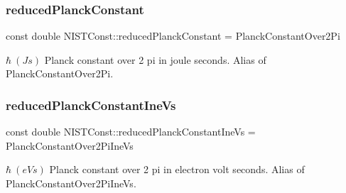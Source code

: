 \subsubsection{\texorpdfstring{reduced\+Planck\+Constant}{reducedPlanckConstant}}
{\footnotesize\ttfamily const double N\+I\+S\+T\+Const\+::reduced\+Planck\+Constant = Planck\+Constant\+Over2\+Pi}

$\hbar \ (J s)$ Planck constant over 2 pi in joule seconds. Alias of Planck\+Constant\+Over2\+Pi. \mbox{\label{group___planck_constant_gab9efdc081c1c1a03ca7a233d1589b1d8}} 
\subsubsection{\texorpdfstring{reduced\+Planck\+Constant\+Ine\+Vs}{reducedPlanckConstantIneVs}}
{\footnotesize\ttfamily const double N\+I\+S\+T\+Const\+::reduced\+Planck\+Constant\+Ine\+Vs = Planck\+Constant\+Over2\+Pi\+Ine\+Vs}

$\hbar \ (eV s)$ Planck constant over 2 pi in electron volt seconds. Alias of Planck\+Constant\+Over2\+Pi\+Ine\+Vs. 